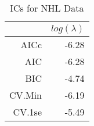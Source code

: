 \begin{table}[ht]
\centering
\begin{tabular}{rr}
  \hline
 & $log(\lambda)$ \\ 
  \hline
AICc & -6.28 \\ 
  AIC & -6.28 \\ 
  BIC & -4.74 \\ 
  CV.Min & -6.19 \\ 
  CV.1se & -5.49 \\ 
   \hline
\end{tabular}
\caption{ICs for NHL Data} 
\label{tab:ic}
\end{table}
